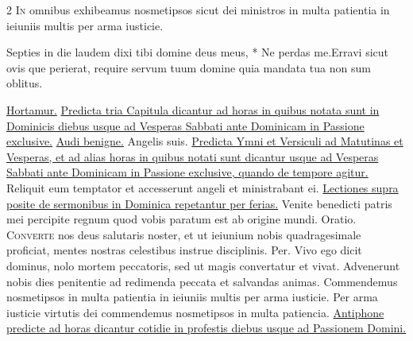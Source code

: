 \begin{multicols*}{2}
\lettrine[lines=2]{\zallmancaps \color{Red} I}{n} omnibus exhibeamus nosmetipsos sicut dei ministros in multa patientia in ieiuniis multis per arma iusticie.
\begin{responsory-breve}
{Septies in die laudem dixi tibi domine deus meus, * Ne perdas me.}{Erravi sicut ovis que perierat, require servum tuum domine quia mandata tua non sum oblitus.}
\end{responsory-breve}%
 \hyperlink{hortamur-vos}{Hortamur.}
\newline \ul{Predicta tria Capitula dicantur ad horas in quibus notata sunt in Dominicis diebus usque ad Vesperas Sabbati ante Dominicam in Passione exclusive.}
 \hyperlink{audi-benigne-conditor}{Audi benigne.} \V Angelis suis.
\newline \ul{Predicta Ymni et Versiculi ad Matutinas et Vesperas, et ad alias horas in quibus notati sunt dicantur usque ad Vesperas Sabbati ante Dominicam in Passione exclusive, quando de tempore agitur.}
 Reliquit eum temptator et accesserunt angeli et ministrabant ei.
\newline \ul{Lectiones supra posite de sermonibus in Dominica repetantur per ferias.}
 Venite benedicti patris mei percipite regnum quod vobis paratum est ab origine mundi. {\color{Red} Oratio.}
\lettrine[lines=2]{\zallmancaps \color{Blue} C}{onverte} nos deus salutaris noster, et ut ieiunium nobis quadragesimale proficiat, mentes nostras celestibus instrue disciplinis. Per.
 Vivo ego dicit dominus, nolo mortem peccatoris, sed ut magis convertatur et vivat.
 Advenerunt nobis dies penitentie ad redimenda peccata et salvandas animas.
 Commendemus nosmetipsos in multa patientia in ieiuniis multis per arma iusticie.
 Per arma iusticie virtutis dei commendemus nosmetipsos in multa patiencia.
\newline \ul{Antiphone predicte ad horas dicantur cotidie in profestis diebus usque ad Passionem Domini.}

\end{multicols*}
